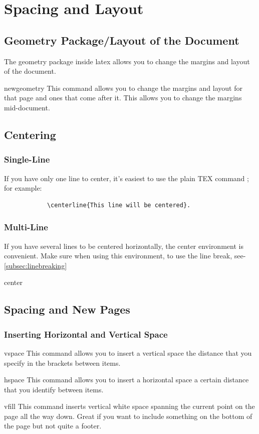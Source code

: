 \section{Spacing and Layout}
\vspace{10.5cm}
	\subsection{Geometry Package/Layout of the Document}
		The geometry package inside latex allows you to change the margins and layout of the document.
			\begin{docCommand}{newgeometry}{} 
				This command allows you to change the margins and layout for that page and ones that come after it. This allows you to change the margins mid-document.
			\end{docCommand}
	\subsection{Centering}
		\subsubsection{Single-Line}
			If you have only one line to center, it’s easiest to use the plain TEX command ; for example:
    		\begin{verbatim}
    	    \centerline{This line will be centered}.
    		\end{verbatim}
		\subsubsection{Multi-Line}
			If you have several lines to be centered horizontally, the center environment is convenient. Make sure when using this environment, to use the line break, see-    \ref{subsec:linebreaking}
			\begin{docEnvironment}{center}{}
			\end{docEnvironment}
	\subsection{Spacing and New Pages}
		\subsubsection{Inserting Horizontal and Vertical Space}
			\begin{docCommand}{vspace}{}
				This command allows you to insert a vertical space the distance that you specify in the brackets between items.
			\end{docCommand}
			\begin{docCommand}{hspace}{}
				This command allows you to insert a horizontal space a certain distance that you identify between items.
			\end{docCommand}
			\begin{docCommand}{vfill}{}
				This command inserts vertical white space spanning the current point on the page all the way down. Great if you want to include something on the bottom of the page but not quite a footer. 
			\end{docCommand}
